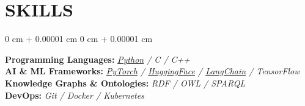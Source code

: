 \documentclass[10pt, letterpaper]{article}
\newenvironment{onecolentry}{
	\begin{adjustwidth}{
			0 cm + 0.00001 cm
		}{
			0 cm + 0.00001 cm
		}
	}{
	\end{adjustwidth}
} %
\begin{document}
%	
%	
%	
%	
%	
%	

%	
	
			\vspace{0.2 cm}	
	\section{SKILLS}
	
			\vspace{0.10 cm}
	\begin{onecolentry}
		\textbf{Programming Languages: } \textit{\underline{Python} / C / C++}\\ 			\vspace{0.07 cm}
		\textbf{AI \& ML Frameworks: } \textit{\underline{PyTorch} / \underline{HuggingFace} / \underline{LangChain} / TensorFlow }\\\vspace{0.07 cm}
		\textbf{Knowledge Graphs \& Ontologies: } \textit{RDF / OWL / SPARQL}\\\vspace{0.07 cm}
		\textbf{DevOps: } \textit{Git / Docker / Kubernetes} \\						
	\end{onecolentry}
	
	
\end{document}
